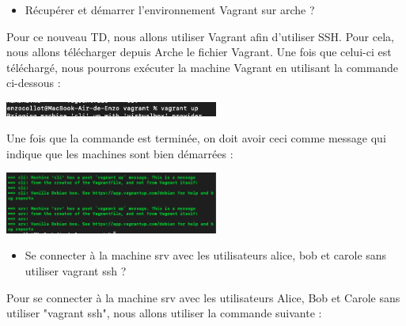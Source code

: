 \documentclass[12pt]{article}
\begin{document}
\begin{itemize}
  \item Récupérer et démarrer l'environnement Vagrant sur arche ?
\end{itemize}

\vspace{0.3cm}

Pour ce nouveau TD, nous allons utiliser Vagrant afin d'utiliser SSH. Pour cela, nous allons télécharger depuis Arche le fichier Vagrant. Une fois que celui-ci est téléchargé, nous pourrons exécuter la machine Vagrant en utilisant la commande ci-dessous :

\vspace{0.3cm}

\begin{center}
  \includegraphics[width=7cm]{Images-Client-SSH/Image-TD-SSH-1/vagrant_up.png}
\end{center}

\vspace{0.3cm}

Une fois que la commande est terminée, on doit avoir ceci comme message qui indique que les machines sont bien démarrées :  

\vspace{0.3cm}

\begin{center}
  \includegraphics[width=7cm]{Images-Client-SSH/Image-TD-SSH-1/Machine.png}
\end{center}

\vspace{0.3cm}

\begin{itemize}
  \item Se connecter à la machine srv avec les utilisateurs alice, bob et carole sans utiliser vagrant ssh ?
\end{itemize}

\vspace{0.3cm}

Pour se connecter à la machine srv avec les utilisateurs Alice, Bob et Carole sans utiliser "vagrant ssh", nous allons utiliser la commande suivante :
\end{document}
